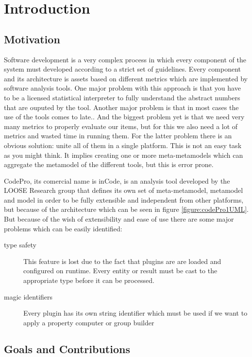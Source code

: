 \chapter{Introduction}\label{ch:1}

\section{Motivation}
	Software development is a very complex process in which every component of the
system must developed according to a strict set of guidelines. Every component
and its architecture is assets based on different metrics which are implemented
by software analysis tools. One major problem with this approach is that you
have to be a licensed statistical interpreter to fully understand the abstract
numbers that are ouputed by the tool. Another major problem is that in most
cases the use of the tools comes to late.\cite{tools:inCode}. And the biggest
problem yet is that we need very many metrics to properly evaluate our items,
but for this we also need a lot of metrics and wasted time in running them.
	For the latter problem there is an obvious solution: unite all of them
in a single platform. This is not an easy task as you might think. It implies
creating one or more meta-metamodels which can aggregate the metamodel of the
different tools, but this is error prone.

	CodePro, its comercial name is inCode\cite{site:inCode}, is an analysis tool
developed by the LOOSE Research group \cite{tools:inCode} that defines its own 
set of meta-metamodel, metamodel and model in order to be fully extensible and
independent from other platforms, but because of the architecture which can be 
seen in figure \ref{figure:codePro1UML}. But because of the wish of
extensibility and ease of use there are some major problems which can be easily
identified:
		\begin{description}
			\item[type safety] This feature is lost due to the fact that plugins are
are loaded and configured on runtime. Every entity or result must be cast to the
appropriate type before it can be processed. 
			\item[magic identifiers] Every plugin has its own string identifier which 
must be used if we want to apply a property computer or group builder  
		\end{description}
	
\section{Goals and Contributions}
	

